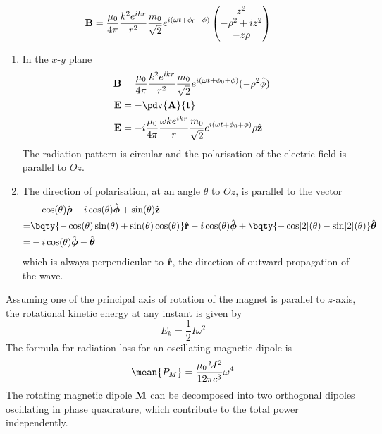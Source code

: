 \documentclass[12pt]{extarticle}
\begin{document}
\begin{outline}
\begin{align*}
            \bf B &=  \frac{\mu_0}{4\pi} \frac{k^2e^{ikr}}{r^2}  \frac{m_0}{\sqrt{2}} e^{i(\omega t + \phi_0 + \phi)} \begin{pmatrix} z^2\\ - \rho^2 + iz^2\\- z\rho \end{pmatrix} 
        \end{align*}
        \begin{enumerate}
        \item In the \(x\text{-}y\) plane \begin{align*}
            \bf B &=   \frac{\mu_0}{4\pi} \frac{k^2e^{ikr}}{r^2}  \frac{m_0}{\sqrt{2}} e^{i(\omega t + \phi_0 + \phi)}( - \rho^2 \hat{\bf \phi})\\
            \bf E &= - \pdv{\bf A}{t}\\         
            \bf E &= - i\frac{\mu_0}{4\pi} \frac{\omega ke^{ikr}}{r}\frac{m_0}{\sqrt{2}} e^{i(\omega t + \phi_0 + \phi)}\rho \hat{\bf z}         
        \end{align*}
        The radiation pattern is circular and the polarisation of the electric field is parallel to \(Oz\).
        \item The direction of polarisation, at an angle \(\theta\) to \(Oz\), is parallel to the vector \begin{align*}
             &- \cos(\theta) \hat{\boldsymbol \rho} - i\cos(\theta) \hat{\boldsymbol \phi} + \sin(\theta) \hat{\bf z} \\=& \bqty{ -\cos(\theta) \sin(\theta) + \sin(\theta) \cos(\theta)} \hat{\bf r} -i\cos(\theta) \hat{\boldsymbol \phi} +\bqty{ - \cos[2](\theta) - \sin[2](\theta)}\hat{\boldsymbol \theta}\\
             =& -i\cos(\theta) \hat{\boldsymbol \phi} - \hat{\boldsymbol \theta}
        \end{align*}
        which is always perpendicular to \(\hat{\bf r}\), the direction of outward propagation of the wave.
        \end{enumerate}
        \1 Assuming one of the principal axis of rotation of the magnet is parallel to \(z\)-axis, the rotational kinetic energy at any instant is given by \[
            E_k = \frac{1}{2} I \omega^2
        \]
        The formula for radiation loss for an oscillating magnetic dipole is \[
            \mean{P_M} = \frac{\mu_0 M^2}{12\pi c^3}\omega^4
        \]
        The rotating magnetic dipole \(\bf M\) can be decomposed into two orthogonal dipoles oscillating in phase quadrature, which contribute to the total power independently. \[
\]
\end{outline}
\end{document}

